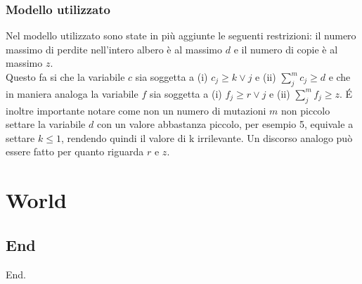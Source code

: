 \documentclass{report}
\begin{document}
  \subsection{Modello utilizzato}
  Nel modello utilizzato sono state in più aggiunte le seguenti restrizioni: il numero massimo di perdite nell'intero albero è al massimo $d$ e il numero di copie è al massimo $z$.\\
  Questo fa si che la variabile $c$ sia soggetta a (i) ${c}_{j}\geq k \vee j$ e (ii) $\sum_{j}^m {c}_{j} \geq d$ e che in maniera analoga la variabile $f$ sia soggetta a (i) ${f}_{j}\geq r \vee j$ e (ii) $\sum_{j}^m {f}_{j} \geq z$. \'E inoltre importante notare come non un numero di mutazioni $m$ non piccolo settare la variabile $d$ con un valore abbastanza piccolo, per esempio 5, equivale a settare $k \leq 1$, rendendo quindi il valore di k irrilevante.
  Un discorso analogo può essere fatto per quanto riguarda $r$ e $z$.

\chapter{World}

\section{End}
  End.
\end{document}
